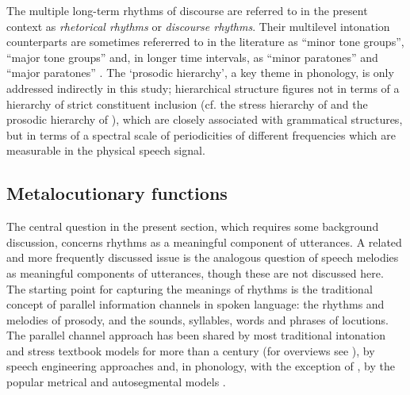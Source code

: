 \documentclass[output=paper,colorlinks,citecolor=brown]{langscibook}
\begin{document}
The multiple long-term rhythms of discourse are referred to in the present context as \textit{rhetorical rhythms} or \textit{discourse rhythms}. Their multilevel intonation counterparts are sometimes refererred to in the literature as ``minor tone groups'', ``major tone groups'' \citep{trim1959} and, in longer time intervals, as ``minor paratones'' and ``major paratones'' \citep{yuleparatone1980}. The `prosodic hierarchy', a key theme in phonology, is only addressed indirectly in this study; hierarchical structure figures not in terms of a hierarchy of strict constituent inclusion (cf. the stress hierarchy of \citet{chomskyhalle1968} and the prosodic hierarchy of \citealt{selkirk1984}), which are closely associated with grammatical structures, but in terms of a spectral scale of periodicities of different frequencies which are measurable in the physical speech signal.

\subsection{Metalocutionary functions}

The central question in the present section, which requires some background discussion, concerns rhythms as a meaningful component of utterances. A related and more frequently discussed issue is the analogous question of speech melodies as meaningful components of utterances, though these are not discussed here. The starting point for capturing the meanings of rhythms is the traditional concept of parallel information channels in spoken language: the rhythms and melodies of prosody, and the sounds, syllables, words and phrases of locutions. The parallel channel approach has been shared by most traditional intonation and stress textbook models for more than a century (for overviews see ), by speech engineering approaches \citep{morikawafujisaki1976, thartcohen73, dutoit2001, fujisaki2004} and, in phonology, with the exception of , by the popular metrical and autosegmental models \citep{barnesshattuckhufnagel2022}.
\end{document}
